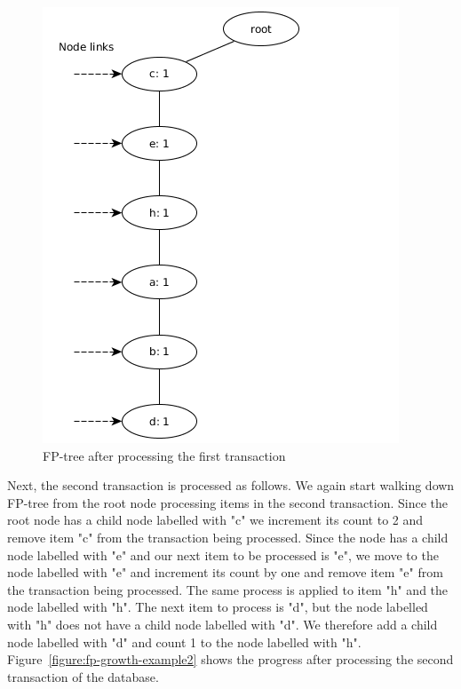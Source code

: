 \begin{figure}[!htbp]
	\centering
	\includegraphics[scale=0.5]{fp-tree-example/fp-tree-p1.png}
	\caption{FP-tree after processing the first transaction}
	\label{figure:fp-growth-example1}
\end{figure}

Next, the second transaction is processed as follows. We again start walking down FP-tree from the root node processing items in the second transaction. Since the root node has a child node labelled with "c" we increment its count to 2 and remove item "c" from the transaction being processed. Since the node has a child node labelled with "e" and our next item to be processed is "e", we move to the node labelled with "e" and increment its count by one and remove item "e" from the transaction being processed. The same process is applied to item "h" and the node labelled with "h". The next item to process is "d", but the node labelled with "h" does not have a child node labelled with "d". We therefore add a child node labelled with "d" and count 1 to the node labelled with "h". Figure~\ref{figure:fp-growth-example2} shows the progress after processing the second transaction of the database.

